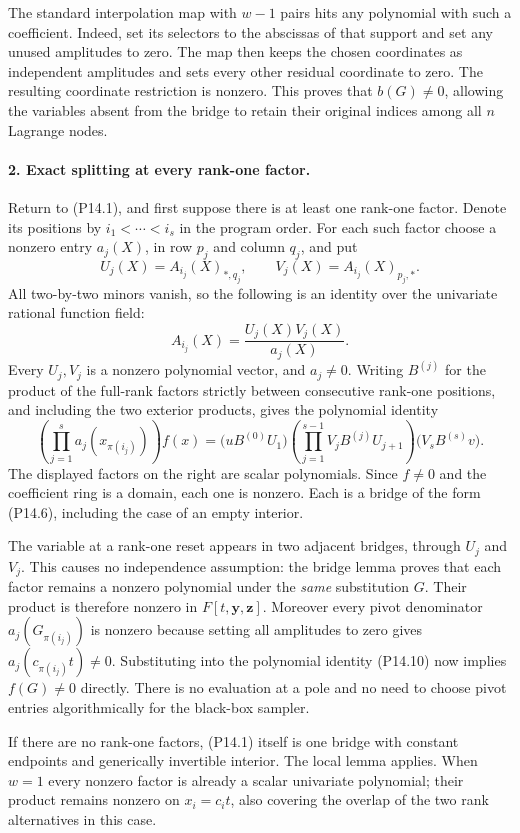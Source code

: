 The standard interpolation map with $w-1$ pairs hits any
polynomial with such a coefficient. Indeed, set its selectors
to the abscissas of that support and set any unused amplitudes
to zero. The map then keeps the chosen coordinates as independent
amplitudes and sets every other residual coordinate to zero.
The resulting coordinate restriction is nonzero. This proves
that $b(G)\ne0$, allowing the variables absent from the bridge
to retain their original indices among all $n$ Lagrange nodes.

\paragraph{2. Exact splitting at every rank-one factor.}
Return to (P14.1), and first suppose there is at least one rank-one
factor. Denote its positions by $i_1<\cdots<i_s$ in the program
order. For each such factor choose a nonzero entry $a_j(X)$,
in row $p_j$ and column $q_j$, and put
\[
 U_j(X)=A_{i_j}(X)_{*,q_j},\qquad
 V_j(X)=A_{i_j}(X)_{p_j,*}.
\]
All two-by-two minors vanish, so the following is an identity
over the univariate rational function field:
\[
 A_{i_j}(X)=\frac{U_j(X)V_j(X)}{a_j(X)}.
 \tag{P14.9}
\]
Every $U_j,V_j$ is a nonzero polynomial vector, and $a_j\ne0$.
Writing $B^{(j)}$ for the product of the full-rank factors
strictly between consecutive rank-one positions, and including
the two exterior products, gives the polynomial identity
\[
 \left(\prod_{j=1}^{s}a_j(x_{\pi(i_j)})\right) f(x)
   =\bigl(uB^{(0)}U_1\bigr)
      \left(\prod_{j=1}^{s-1}V_jB^{(j)}U_{j+1}\right)
       \bigl(V_sB^{(s)}v\bigr).
 \tag{P14.10}
\]
The displayed factors on the right are scalar polynomials.
Since $f\ne0$ and the coefficient ring is a domain, each one
is nonzero. Each is a bridge of the form (P14.6), including
the case of an empty interior.

The variable at a rank-one reset appears in two adjacent
bridges, through $U_j$ and $V_j$. This causes no independence
assumption: the bridge lemma proves that each factor remains
a nonzero polynomial under the \emph{same} substitution $G$.
Their product is therefore nonzero in
$F[t,\mathbf y,\mathbf z]$. Moreover every pivot denominator
$a_j(G_{\pi(i_j)})$ is nonzero because setting all amplitudes
to zero gives $a_j(c_{\pi(i_j)}t)\ne0$. Substituting into the
polynomial identity (P14.10) now implies $f(G)\ne0$ directly.
There is no evaluation at a pole and no need to choose pivot
entries algorithmically for the black-box sampler.

If there are no rank-one factors, (P14.1) itself is one bridge
with constant endpoints and generically invertible interior.
The local lemma applies. When $w=1$ every nonzero factor is
already a scalar univariate polynomial; their product remains
nonzero on $x_i=c_it$, also covering the overlap of the two
rank alternatives in this case.

